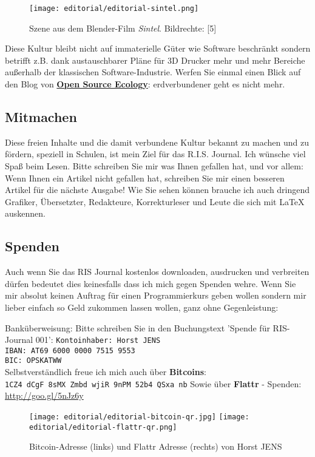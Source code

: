 \documentclass[10pt,a4paper,ngerman,twoside]{article} %
\begin{document}
\begin{figure}
\texttt{[image: editorial/editorial-sintel.png]}\\
\caption{Szene aus dem Blender-Film \emph{Sintel}. Bildrechte: [5]}
\end{figure}

Diese Kultur bleibt nicht auf immaterielle Güter wie Software beschränkt sondern betrifft z.B. dank austauschbarer Pläne für 3D Drucker mehr und mehr Bereiche außerhalb der klassischen Software-Industrie. Werfen Sie einmal einen Blick auf den Blog von \href{http://opensourceecology.org/}{\textbf{Open Source Ecology}}: erdverbundener geht es nicht mehr. 

\subsection*{Mitmachen}
Diese freien Inhalte und die damit verbundene Kultur bekannt zu machen und zu fördern, speziell in Schulen, ist mein Ziel für das R.I.S. Journal. Ich wünsche viel Spaß beim Lesen. Bitte schreiben Sie mir was Ihnen gefallen hat, und vor allem: Wenn Ihnen ein Artikel nicht gefallen hat, schreiben Sie mir einen besseren Artikel für die nächste Ausgabe! Wie Sie sehen können brauche ich auch dringend Grafiker, Übersetzter, Redakteure, Korrekturleser und Leute die sich mit {\large \LaTeX} auskennen. 

\subsection*{Spenden}
Auch wenn Sie das RIS Journal kostenlos downloaden, ausdrucken und verbreiten dürfen bedeutet dies keinesfalls dass ich mich gegen Spenden wehre. Wenn Sie mir absolut keinen Auftrag für einen Programmierkurs geben wollen sondern mir lieber einfach so Geld zukommen lassen wollen, ganz ohne Gegenleistung:


Banküberweisung: Bitte schreiben Sie in den Buchungstext 'Spende für RIS-Journal 001':
\texttt{Kontoinhaber: Horst JENS \\
IBAN: AT69 6000 0000 7515 9553\\
BIC: OPSKATWW} \\
Selbstverständlich freue ich mich auch über \textbf{Bitcoins}:\\
\texttt{1CZ4 dCgF 8sMX Zmbd wjiR 9nPM 52b4 QSxa nb}
Sowie über \textbf{Flattr} - Spenden: \url{http://goo.gl/5nJz6y}
\begin{figure}
\texttt{[image: editorial/editorial-bitcoin-qr.jpg]} 
\texttt{[image: editorial/editorial-flattr-qr.png]}
\caption{Bitcoin-Adresse (links) und Flattr Adresse (rechts) von Horst JENS}
\end{figure}
\end{document}
